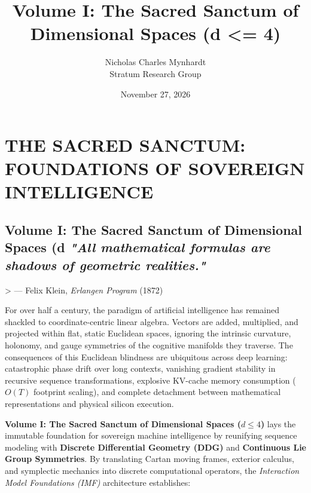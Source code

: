 \documentclass[11pt,twoside,openright]{amsbook}
\title{Volume I: The Sacred Sanctum of Dimensional Spaces (d <= 4)}
\author{Nicholas Charles Mynhardt \\ Stratum Research Group}
\date{November 27, 2026}
\begin{document}
\maketitle
\tableofcontents


  


\chapter{THE SACRED SANCTUM: FOUNDATIONS OF SOVEREIGN INTELLIGENCE}
\section{Volume I: The Sacred Sanctum of Dimensional Spaces (d  \textit{"All mathematical formulas are shadows of geometric realities."}  }
> — Felix Klein, \textit{Erlangen Program} (1872)

For over half a century, the paradigm of artificial intelligence has remained shackled to coordinate-centric linear algebra. Vectors are added, multiplied, and projected within flat, static Euclidean spaces, ignoring the intrinsic curvature, holonomy, and gauge symmetries of the cognitive manifolds they traverse. The consequences of this Euclidean blindness are ubiquitous across deep learning: catastrophic phase drift over long contexts, vanishing gradient stability in recursive sequence transformations, explosive KV-cache memory consumption ($O(T)$ footprint scaling), and complete detachment between mathematical representations and physical silicon execution.

\textbf{Volume I: The Sacred Sanctum of Dimensional Spaces ($d \le 4$)} lays the immutable foundation for sovereign machine intelligence by reunifying sequence modeling with \textbf{Discrete Differential Geometry (DDG)} and \textbf{Continuous Lie Group Symmetries}. By translating Cartan moving frames, exterior calculus, and symplectic mechanics into discrete computational operators, the \textit{Interaction Model Foundations (IMF)} architecture establishes:
\end{document}
